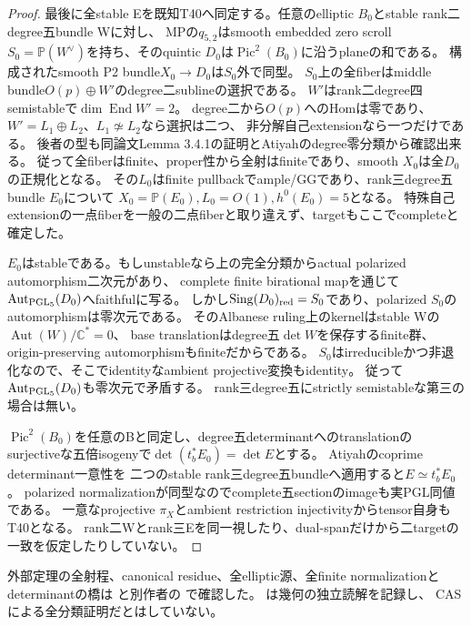 \documentclass[a4paper,11pt]{ltjsarticle}
\theoremstyle{definition}
\begin{document}
\begin{proof}
最後に全stable Eを既知T40へ同定する。任意のelliptic $B_0$とstable rank二degree五bundle Wに対し、
MP\cite[\S3.2, Lemmas 3.2.1,3.2.3,3.2.4]{mpq52}の$q_{5,2}$はsmooth embedded zero scroll
$S_0=\mathbb P(W^\vee)$を持ち、そのquintic $D_0$は$\operatorname{Pic}^2(B_0)$に沿うplaneの和である。
構成されたsmooth P2 bundle$X_0\to D_0$は$S_0$外で同型。
$S_0$上の全fiberはmiddle bundle$O(p)\oplus W'$のdegree二sublineの選択である。
$W'$はrank二degree四semistableで$\dim\operatorname{End}W'=2$。
degree二から$O(p)$へのHomは零であり、$W'=L_1\oplus L_2$、$L_1\not\simeq L_2$なら選択は二つ、
非分解自己extensionなら一つだけである。
後者の型も同論文Lemma 3.4.1の証明とAtiyahのdegree零分類から確認出来る。
従って全fiberはfinite、proper性から全射はfiniteであり、smooth $X_0$は全$D_0$の正規化となる。
その$L_0$はfinite pullbackでample/GGであり、rank三degree五bundle $E_0$について
$X_0=\mathbb P(E_0),L_0=O(1),h^0(E_0)=5$となる。
特殊自己extensionの一点fiberを一般の二点fiberと取り違えず、targetもここでcompleteと確定した。

$E_0$はstableである。もしunstableなら上の完全分類からactual polarized automorphism二次元があり、
complete finite birational mapを通じて$\operatorname{Aut}_{\rm PGL_5}(D_0)$へfaithfulに写る。
しかし$\operatorname{Sing}(D_0)_{\rm red}=S_0$であり、polarized $S_0$のautomorphismは零次元である。
そのAlbanese ruling上のkernelはstable Wの$\operatorname{Aut}(W)/\mathbb C^*=0$、
base translationはdegree五$\det W$を保存するfinite群、origin-preserving automorphismもfiniteだからである。
$S_0$はirreducibleかつ非退化なので、そこでidentityなambient projective変換もidentity。
従って$\operatorname{Aut}_{\rm PGL_5}(D_0)$も零次元で矛盾する。
rank三degree五にstrictly semistableな第三の場合は無い。

$\operatorname{Pic}^2(B_0)$を任意のBと同定し、degree五determinantへのtranslationの
surjectiveな五倍isogenyで$\det(t_b^*E_0)=\det E$とする。
Atiyah\cite[Theorem 7及びCorollary, p.434]{atiyahelliptic}のcoprime determinant一意性を
二つのstable rank三degree五bundleへ適用すると$E\simeq t_b^*E_0$。
polarized normalizationが同型なのでcomplete五sectionのimageも実PGL同値である。
一意なprojective $\pi_X$とambient restriction injectivityからtensor自身もT40となる。
rank二Wとrank三Eを同一視したり、dual-spanだけから二targetの一致を仮定したりしていない。
\end{proof}
外部定理の全射程、canonical residue、全elliptic源、全finite normalizationとdeterminantの橋は
と別作者の
で確認した。
は幾何の独立読解を記録し、
CASによる全分類証明だとはしていない。
\end{document}
